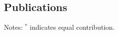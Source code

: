\documentclass[margin]{res}
\begin{document}
\begin{resume}



\section{Publications}
\hypertarget{sec:publications}{}



Notes: $^*$ indicates equal contribution.









\end{resume}
\end{document}
